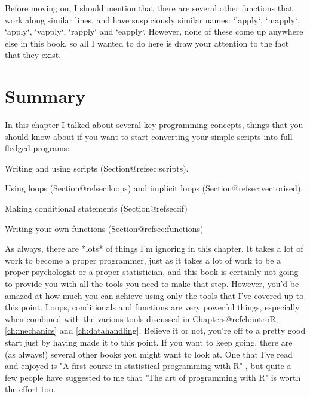 Before moving on, I should mention that there are several other functions that work along similar lines, and have suspiciously similar names: `lapply`, `mapply`, `apply`, `vapply`, `rapply` and `eapply`. However, none of these come up anywhere else in this book, so all I wanted to do here is draw your attention to the fact that they exist.






\section{Summary}

In this chapter I talked about several key programming concepts, things that you should know about if you want to start converting your simple scripts into full fledged programs:


\item Writing and using scripts (Section@refsec:scripts).
\item Using loops (Section@refsec:loops) and implicit loops (Section@refsec:vectorised).
\item Making conditional statements (Section@refsec:if)
\item Writing your own functions (Section@refsec:functions)



As always, there are *lots* of things I'm ignoring in this chapter. It takes a lot of work to become a proper programmer, just as it takes a lot of work to be a proper psychologist or a proper statistician, and this book is certainly not going to provide you with all the tools you need to make that step. However, you'd be amazed at how much you can achieve using only the tools that I've covered up to this point. Loops, conditionals and functions are very powerful things, especially when combined with the various tools discussed in Chapters@refch:introR, \ref{ch:mechanics} and \ref{ch:datahandling}. Believe it or not, you're off to a pretty good start just by having made it to this point. If you want to keep going, there are (as always!) several other books you might want to look at. One that I've read and enjoyed is  "A first course in statistical programming with R" \cite{Braun2007}, but quite a few people have suggested to me that "The art of programming with R" \cite{Matloff2011} is worth the effort too. 




